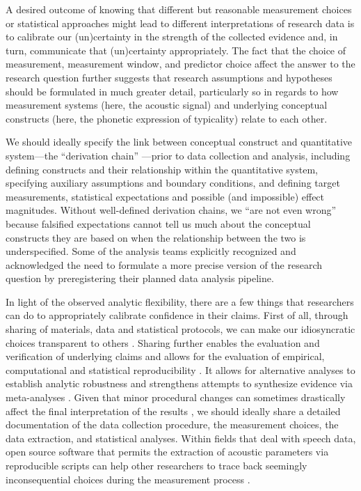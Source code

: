 \documentclass[Review,times,sageh]{sagej}
\begin{document}
A desired outcome of knowing that different but reasonable measurement choices or statistical approaches might lead to different interpretations of research data is to calibrate our (un)certainty in the strength of the collected evidence and, in turn, communicate that (un)certainty appropriately.
The fact that the choice of measurement, measurement window, and predictor choice affect the answer to the research question further suggests that research assumptions and hypotheses should be formulated in much greater detail, particularly so in regards to how measurement systems (here, the acoustic signal) and underlying conceptual constructs (here, the phonetic expression of typicality) relate to each other.

We should ideally specify the link between conceptual construct and quantitative system---the ``derivation chain'' \citep{dubin1970theory, meehl1990summaries}---prior to data collection and analysis, including defining constructs and their relationship within the quantitative system, specifying auxiliary assumptions and boundary conditions, and defining target measurements, statistical expectations and possible (and impossible) effect magnitudes.
Without well-defined derivation chains, we ``are not even wrong'' \citep{scheel2022most} because falsified expectations cannot tell us much about the conceptual constructs they are based on when the relationship between the two is underspecified.
Some of the analysis teams explicitly recognized and acknowledged the need to formulate a more precise version of the research question by preregistering their planned data analysis pipeline.

In light of the observed analytic flexibility, there are a few things that researchers can do to appropriately calibrate confidence in their claims.
First of all, through sharing of materials, data and statistical protocols, we can make our idiosyncratic choices transparent to others \citep{munafo2017manifesto, vazire2017quality}.
Sharing further enables the evaluation and verification of underlying claims and allows for the evaluation of empirical, computational and statistical reproducibility \citep{lebel2018unified}.
It allows for alternative analyses to establish analytic robustness \citep{steegen2016increasing} and strengthens attempts to synthesize evidence via meta-analyses \citep[e.g.,][]{nicenboim2018using}.
Given that minor procedural changes can sometimes drastically affect the final interpretation of the results \citep{breznau2021observing}, we should ideally share a detailed documentation of the data collection procedure, the measurement choices, the data extraction, and statistical analyses.
Within fields that deal with speech data, open source software that permits the extraction of acoustic parameters via reproducible scripts can help other researchers to trace back seemingly inconsequential choices during the measurement process \citetext{\citealp[e.g., Praat:][]{boersma2021praat}; \citealp[EMU:][]{winkelmann2017emu}; \citealp[the Montreal Forced Aligner:][]{mcauliffe2017}}.
\end{document}
